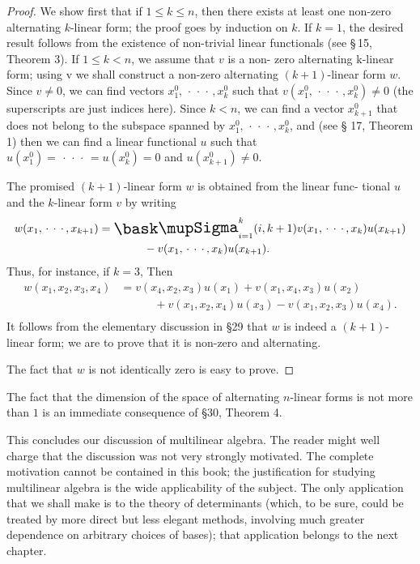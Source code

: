 \begin{proof}
    We show first that if \(1 \leq k \leq n\), then there exists at least one
    non-zero alternating \(k\)-linear form; the proof goes by induction on
    \(k\). If \(k = 1\), the desired result follows from the existence of
    non-trivial linear functionals (see §\,15, Theorem 3). If \(1 \leq k < n\),
    we assume that \(v\) is a non- zero alternating k-linear form; using v we
    shall construct a non-zero alternating \((k+1)\)-linear form \(w\). Since
    \(v \neq 0\), we can find vectors \(x^0_1, \,\cdot\,\cdot\,\cdot\,, x^0_k\)
    such that \(v(x^0_1, \,\cdot\,\cdot\,\cdot\,, x^0_k) \neq 0\) (the
    superscripts are just indices here). Since \(k < n\), we can find a vector
    \(x^0_{k+1}\) that does not belong to the subspace spanned by \(x^0_1,
    \,\cdot\,\cdot\,\cdot\,, x^0_k\), and (see § 17, Theorem 1) then we can find
    a linear functional \(u\) such that \(u(x^0_1) = \,\cdot\,\cdot\,\cdot\, =
    u(x^0_k) = 0\) and \(u(x^0_{k+1}) \neq 0\).

    The promised \((k + 1)\)-linear form \(w\) is obtained from the linear func- tional \(u\) and the \(k\)-linear form \(v\) by writing
    \begin{align}
        w(x_1, \,\cdot\,\cdot\,\cdot\,, x_{k+1}) &= \sumx_{i = 1}^k (i, k+1) v(x_1, \,\cdot\,\cdot\,\cdot\,, x_k)u(x_{k+1})\\
        &\qquad\qquad - v(x_1, \,\cdot\,\cdot\,\cdot\,, x_k)u(x_{k+1}). \nonumber
    \end{align}
    Thus, for instance, if \(k=3\), Then
    \begin{align*}
        w(x_1, x_2, x_3, x_4) &= v(x_4, x_2, x_3)u(x_1) + v(x_1, x_4, x_3)u(x_2)\\
         &\qquad \quad + v(x_1, x_2, x_4)u(x_3) - v(x_1, x_2, x_3)u(x_4).\\
    \end{align*}
    It follows from the elementary discussion in §29 that \(w\) is indeed a \((k
    + 1)\)-linear form; we are to prove that it is non-zero and alternating.

    The fact that \(w\) is not identically zero is easy to prove.

\end{proof}

The fact that the dimension of the space of alternating \(n\)-linear forms is
not more than \(1\) is an immediate consequence of §30, Theorem 4.

This concludes our discussion of multilinear algebra. The reader might well
charge that the discussion was not very strongly motivated. The complete
motivation cannot be contained in this book; the justification for studying
multilinear algebra is the wide applicability of the subject. The only
application that we shall make is to the theory of determinants (which, to be
sure, could be treated by more direct but less elegant methods, involving much
greater dependence on arbitrary choices of bases); that application belongs to
the next chapter.
